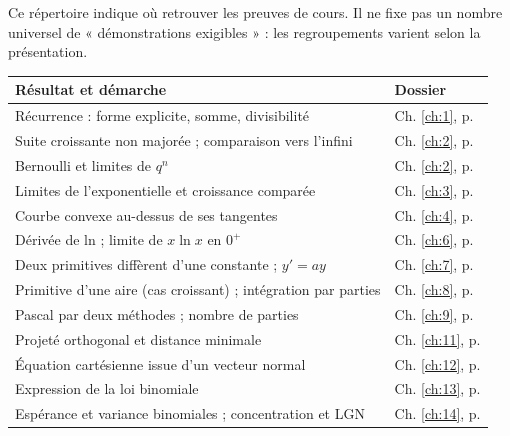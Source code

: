Ce répertoire indique où retrouver les preuves de cours. Il ne fixe pas un nombre universel de « démonstrations exigibles » : les regroupements varient selon la présentation.
\begin{longtable}{@{}p{}p{}@{}}\toprule\textbf{Résultat et démarche}&\textbf{Dossier}\\\midrule\endhead
Récurrence : forme explicite, somme, divisibilité&Ch. \ref{ch:1}, p. \pageref{ch:1}\\
Suite croissante non majorée ; comparaison vers l'infini&Ch. \ref{ch:2}, p. \pageref{ch:2}\\
Bernoulli et limites de $q^n$&Ch. \ref{ch:2}, p. \pageref{ch:2}\\
Limites de l'exponentielle et croissance comparée&Ch. \ref{ch:3}, p. \pageref{ch:3}\\
Courbe convexe au-dessus de ses tangentes&Ch. \ref{ch:4}, p. \pageref{ch:4}\\
Dérivée de ln ; limite de $x\ln x$ en $0^+$&Ch. \ref{ch:6}, p. \pageref{ch:6}\\
Deux primitives diffèrent d'une constante ; $y'=ay$&Ch. \ref{ch:7}, p. \pageref{ch:7}\\
Primitive d'une aire (cas croissant) ; intégration par parties&Ch. \ref{ch:8}, p. \pageref{ch:8}\\
Pascal par deux méthodes ; nombre de parties&Ch. \ref{ch:9}, p. \pageref{ch:9}\\
Projeté orthogonal et distance minimale&Ch. \ref{ch:11}, p. \pageref{ch:11}\\
Équation cartésienne issue d'un vecteur normal&Ch. \ref{ch:12}, p. \pageref{ch:12}\\
Expression de la loi binomiale&Ch. \ref{ch:13}, p. \pageref{ch:13}\\
Espérance et variance binomiales ; concentration et LGN&Ch. \ref{ch:14}, p. \pageref{ch:14}\\\bottomrule\end{longtable}
